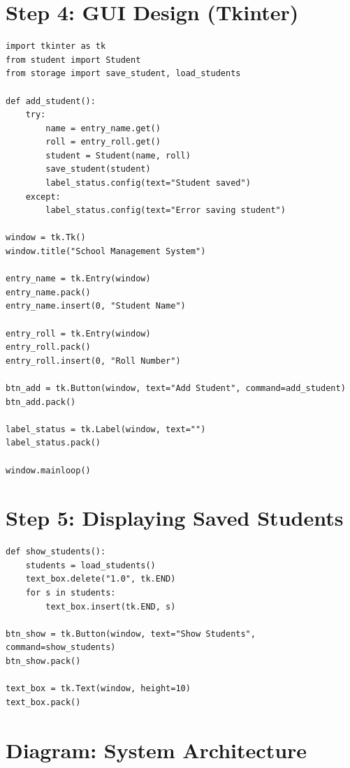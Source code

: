 \section{Step 4: GUI Design (Tkinter)}

\begin{verbatim}
import tkinter as tk
from student import Student
from storage import save_student, load_students

def add_student():
    try:
        name = entry_name.get()
        roll = entry_roll.get()
        student = Student(name, roll)
        save_student(student)
        label_status.config(text="Student saved")
    except:
        label_status.config(text="Error saving student")

window = tk.Tk()
window.title("School Management System")

entry_name = tk.Entry(window)
entry_name.pack()
entry_name.insert(0, "Student Name")

entry_roll = tk.Entry(window)
entry_roll.pack()
entry_roll.insert(0, "Roll Number")

btn_add = tk.Button(window, text="Add Student", command=add_student)
btn_add.pack()

label_status = tk.Label(window, text="")
label_status.pack()

window.mainloop()
\end{verbatim}

\section{Step 5: Displaying Saved Students}

\begin{verbatim}
def show_students():
    students = load_students()
    text_box.delete("1.0", tk.END)
    for s in students:
        text_box.insert(tk.END, s)

btn_show = tk.Button(window, text="Show Students", command=show_students)
btn_show.pack()

text_box = tk.Text(window, height=10)
text_box.pack()
\end{verbatim}

\section{Diagram: System Architecture}

\begin{center}
\end{center}

